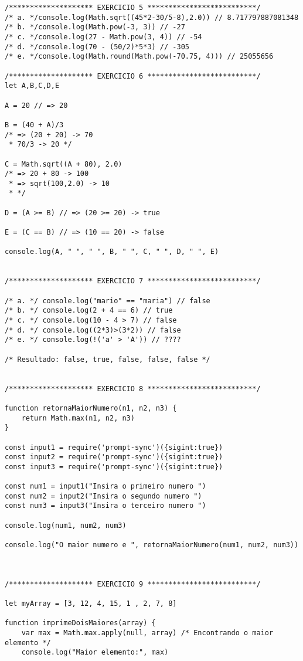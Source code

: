 \documentclass{scrreprt}
\begin{document}
\begin{lstlisting}[style=htmlcssjs]
/******************** EXERCICIO 5 **************************/
/* a. */console.log(Math.sqrt((45*2-30/5-8),2.0)) // 8.717797887081348
/* b. */console.log(Math.pow(-3, 3)) // -27 
/* c. */console.log(27 - Math.pow(3, 4)) // -54 
/* d. */console.log(70 - (50/2)*5*3) // -305
/* e. */console.log(Math.round(Math.pow(-70.75, 4))) // 25055656 

/******************** EXERCICIO 6 **************************/
let A,B,C,D,E

A = 20 // => 20

B = (40 + A)/3 
/* => (20 + 20) -> 70 
 * 70/3 -> 20 */

C = Math.sqrt((A + 80), 2.0)
/* => 20 + 80 -> 100
 * => sqrt(100,2.0) -> 10
 * */

D = (A >= B) // => (20 >= 20) -> true

E = (C == B) // => (10 == 20) -> false

console.log(A, " ", " ", B, " ", C, " ", D, " ", E)


/******************** EXERCICIO 7 **************************/

/* a. */ console.log("mario" == "maria") // false
/* b. */ console.log(2 + 4 == 6) // true
/* c. */ console.log(10 - 4 > 7) // false
/* d. */ console.log((2*3)>(3*2)) // false
/* e. */ console.log(!('a' > 'A')) // ????

/* Resultado: false, true, false, false, false */


/******************** EXERCICIO 8 **************************/

function retornaMaiorNumero(n1, n2, n3) {
	return Math.max(n1, n2, n3)
}

const input1 = require('prompt-sync')({sigint:true})
const input2 = require('prompt-sync')({sigint:true})
const input3 = require('prompt-sync')({sigint:true})

const num1 = input1("Insira o primeiro numero ")
const num2 = input2("Insira o segundo numero ")
const num3 = input3("Insira o terceiro numero ")

console.log(num1, num2, num3)

console.log("O maior numero e ", retornaMaiorNumero(num1, num2, num3))



/******************** EXERCICIO 9 **************************/

let myArray = [3, 12, 4, 15, 1 , 2, 7, 8]

function imprimeDoisMaiores(array) { 
	var max = Math.max.apply(null, array) /* Encontrando o maior elemento */ 
	console.log("Maior elemento:", max)


\end{lstlisting}
\end{document}

